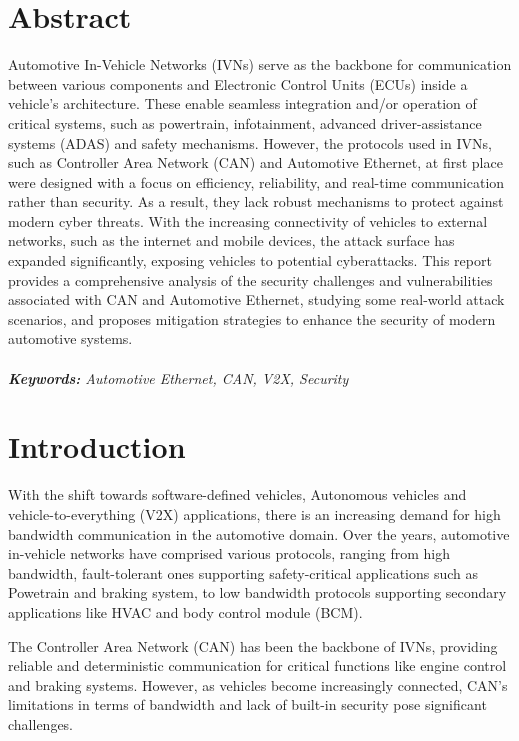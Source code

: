 \documentclass{report}
\begin{document}
\section*{Abstract}
Automotive In-Vehicle Networks (IVNs) serve as the backbone for communication between various components and Electronic Control Units (ECUs) inside a vehicle's architecture. These enable seamless integration and/or operation of critical systems, such as powertrain, infotainment, advanced driver-assistance systems (ADAS) and safety mechanisms. However, the protocols used in IVNs, such as Controller Area Network (CAN) and Automotive Ethernet, at first place were designed with a focus on efficiency, reliability, and real-time communication rather than security. As a result, they lack robust mechanisms to protect against modern cyber threats. With the increasing connectivity of vehicles to external networks, such as the internet and mobile devices, the attack surface has expanded significantly, exposing vehicles to potential cyberattacks. This report provides a comprehensive analysis of the security challenges and vulnerabilities associated with CAN and Automotive Ethernet, studying some real-world attack scenarios, and proposes mitigation strategies to enhance the security of modern automotive systems.
\\
\\
\emph{\textbf{Keywords:} Automotive Ethernet, CAN, V2X, Security}

\section*{Introduction}
With the shift towards software-defined vehicles, Autonomous vehicles and vehicle-to-everything (V2X) applications, there is an increasing demand for high bandwidth communication in the automotive domain. Over the years, automotive in-vehicle networks have comprised various protocols, ranging from high bandwidth, fault-tolerant ones supporting safety-critical applications such as Powetrain and braking system,  to low bandwidth protocols supporting secondary applications like HVAC and body control module (BCM).

The Controller Area Network (CAN)  has been the backbone of IVNs, providing reliable and deterministic communication for critical functions like engine control and braking systems. However, as vehicles become increasingly connected, CAN's limitations in terms of bandwidth and lack of built-in security pose significant challenges.
\end{document}
